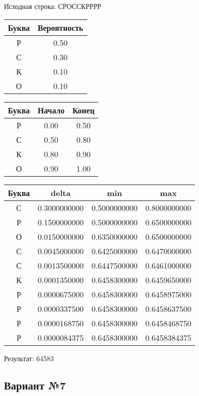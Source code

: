 \documentclass[a4paper, 12pt]{article}
\begin{document}
Исходная строка: СРОССКРРРР\
\begin{center}
 \begin{tabular}{ |c|c| } 
  \hline
     Буква & Вероятность \\ \hline
Р & 0.50\\\hline
С & 0.30\\\hline
К & 0.10\\\hline
О & 0.10
\\ \hline \end{tabular}
\end{center}
\begin{center}
 \begin{tabular}{ |c|c|c| } 
  \hline
     Буква & Начало & Конец \\ \hline
Р & 0.00 & 0.50\\\hline
С & 0.50 & 0.80\\\hline
К & 0.80 & 0.90\\\hline
О & 0.90 & 1.00
\\ \hline \end{tabular}
\end{center}
\begin{center}
 \begin{tabular}{ |c|c|c|c| } 
  \hline
     Буква & delta & min & max \\ \hline
С & 0.3000000000 & 0.5000000000 & 0.8000000000\\\hline
Р & 0.1500000000 & 0.5000000000 & 0.6500000000\\\hline
О & 0.0150000000 & 0.6350000000 & 0.6500000000\\\hline
С & 0.0045000000 & 0.6425000000 & 0.6470000000\\\hline
С & 0.0013500000 & 0.6447500000 & 0.6461000000\\\hline
К & 0.0001350000 & 0.6458300000 & 0.6459650000\\\hline
Р & 0.0000675000 & 0.6458300000 & 0.6458975000\\\hline
Р & 0.0000337500 & 0.6458300000 & 0.6458637500\\\hline
Р & 0.0000168750 & 0.6458300000 & 0.6458468750\\\hline
Р & 0.0000084375 & 0.6458300000 & 0.6458384375
\\ \hline \end{tabular}
\end{center}
Результат: 64583
\pagebreak
\subsection{Вариант №7}
\end{document}

